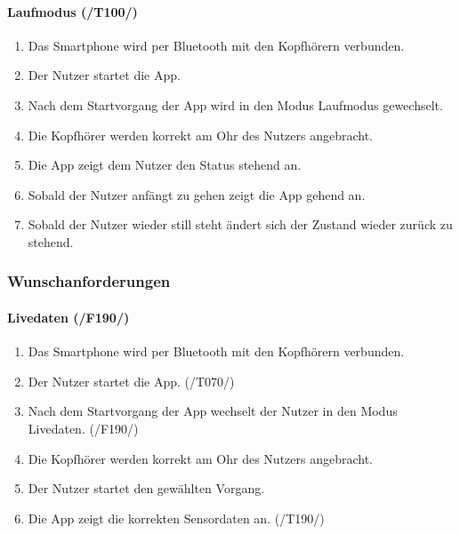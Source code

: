 \documentclass[a4paper,12pt]{article}
\begin{document}
      \paragraph{Laufmodus (/T100/)}
      \begin{enumerate}
        \item Das Smartphone wird per Bluetooth mit den Kopfhörern verbunden.
        \item Der Nutzer startet die App.
        \item Nach dem Startvorgang der App wird in den Modus \glqq Laufmodus\grqq{} gewechselt.
        \item Die Kopfhörer werden korrekt am Ohr des Nutzers angebracht.
        \item Die App zeigt dem Nutzer den Status \glqq stehend\grqq{} an.
        \item Sobald der Nutzer anfängt zu gehen zeigt die App \glqq gehend\grqq{} an.
        \item Sobald der Nutzer wieder still steht ändert sich der Zustand wieder zurück zu \glqq stehend\grqq. 
      \end{enumerate}

    \subsubsection{Wunschanforderungen}
        
    \paragraph{Livedaten (/F190/)}
      \begin{enumerate}
        \item Das Smartphone wird per Bluetooth mit den Kopfhörern verbunden.
        \item Der Nutzer startet die App. (/T070/)
        \item Nach dem Startvorgang der App wechselt der Nutzer in den Modus \glqq Livedaten\grqq . (/F190/)
        \item Die Kopfhörer werden korrekt am Ohr des Nutzers angebracht.
        \item Der Nutzer startet den gewählten \Gls{Vorgang}.
        \item Die App zeigt die korrekten Sensordaten an. (/T190/)
      \end{enumerate}

    
\end{document}
